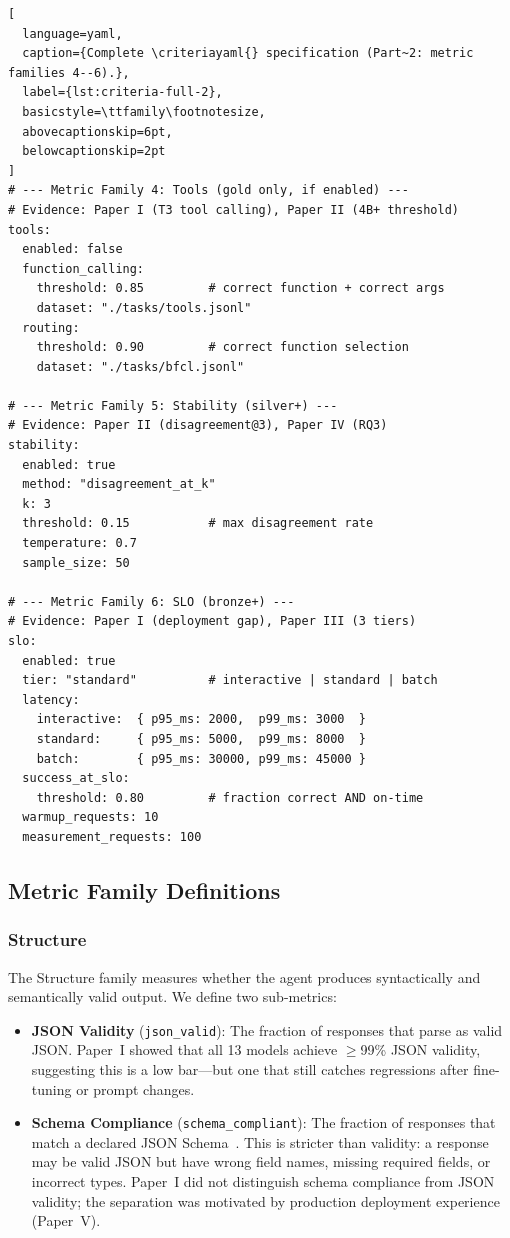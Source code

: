\documentclass[11pt]{article}
\newcommand{\criteriayaml}{\texttt{criteria.yaml}}
\begin{document}
\begin{lstlisting}[
  language=yaml,
  caption={Complete \criteriayaml{} specification (Part~2: metric families 4--6).},
  label={lst:criteria-full-2},
  basicstyle=\ttfamily\footnotesize,
  abovecaptionskip=6pt,
  belowcaptionskip=2pt
]
# --- Metric Family 4: Tools (gold only, if enabled) ---
# Evidence: Paper I (T3 tool calling), Paper II (4B+ threshold)
tools:
  enabled: false
  function_calling:
    threshold: 0.85         # correct function + correct args
    dataset: "./tasks/tools.jsonl"
  routing:
    threshold: 0.90         # correct function selection
    dataset: "./tasks/bfcl.jsonl"

# --- Metric Family 5: Stability (silver+) ---
# Evidence: Paper II (disagreement@3), Paper IV (RQ3)
stability:
  enabled: true
  method: "disagreement_at_k"
  k: 3
  threshold: 0.15           # max disagreement rate
  temperature: 0.7
  sample_size: 50

# --- Metric Family 6: SLO (bronze+) ---
# Evidence: Paper I (deployment gap), Paper III (3 tiers)
slo:
  enabled: true
  tier: "standard"          # interactive | standard | batch
  latency:
    interactive:  { p95_ms: 2000,  p99_ms: 3000  }
    standard:     { p95_ms: 5000,  p99_ms: 8000  }
    batch:        { p95_ms: 30000, p99_ms: 45000 }
  success_at_slo:
    threshold: 0.80         # fraction correct AND on-time
  warmup_requests: 10
  measurement_requests: 100
\end{lstlisting}

\subsection{Metric Family Definitions}

\subsubsection{Structure}

The Structure family measures whether the agent produces syntactically and semantically valid output. We define two sub-metrics:

\begin{itemize}[leftmargin=12pt]
  \item \textbf{JSON Validity} (\texttt{json\_valid}): The fraction of responses that parse as valid JSON. Paper~I showed that all 13 models achieve $\geq$99\% JSON validity, suggesting this is a low bar---but one that still catches regressions after fine-tuning or prompt changes.

  \item \textbf{Schema Compliance} (\texttt{schema\_compliant}): The fraction of responses that match a declared JSON Schema~\citep{jsonschema2020}. This is stricter than validity: a response may be valid JSON but have wrong field names, missing required fields, or incorrect types. Paper~I did not distinguish schema compliance from JSON validity; the separation was motivated by production deployment experience (Paper~V).
\end{itemize}
\end{document}
